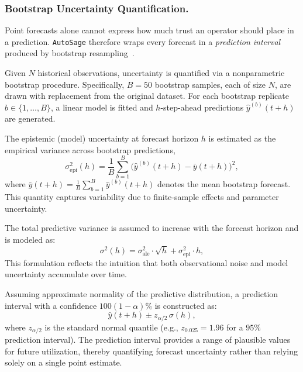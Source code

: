 \documentclass[sigconf]{acmart}
\newcommand{\Solution}{\texttt{AutoSage}}
\begin{document}
\subsubsection{Bootstrap Uncertainty Quantification.}
\label{subsec:uncert}

Point forecasts alone cannot express how much trust an operator should place in a prediction.  \Solution{} therefore wraps every forecast in a \emph{prediction interval} produced by bootstrap resampling~\cite{efron1993introduction}.

Given $N$ historical observations, uncertainty is quantified via a nonparametric bootstrap procedure. Specifically, $B = 50$ bootstrap samples, each of size $N$, are drawn with replacement from the original dataset. For each bootstrap replicate $b \in \{1,\dots,B\}$, a linear model is fitted and $h$-step-ahead predictions $\hat{y}^{(b)}(t+h)$ are generated.

The epistemic (model) uncertainty at forecast horizon $h$ is estimated as the empirical variance across bootstrap predictions,
\begin{equation}\label{eq:epistemic} \sigma^2_{\mathrm{epi}}(h) = \frac{1}{B}\sum_{b=1}^{B} \bigl(\hat{y}^{(b)}(t+h) - \bar{y}(t+h)\bigr)^{2}, 
\end{equation}
where $\bar{y}(t+h) = \frac{1}{B}\sum_{b=1}^{B}\hat{y}^{(b)}(t+h)$ denotes the mean bootstrap forecast. This quantity captures variability due to finite-sample effects and parameter uncertainty.

The total predictive variance is assumed to increase with the forecast horizon and is modeled as:
\begin{equation}\label{eq:total_var}
  \sigma^2(h) = \sigma^2_{\mathrm{ale}} \cdot \sqrt{h}
              + \sigma^2_{\mathrm{epi}} \cdot h,
\end{equation}
This formulation reflects the intuition that both observational noise and model uncertainty accumulate over time.

Assuming approximate normality of the predictive distribution, a prediction interval with a confidence $100(1-\alpha)\%$ is constructed as:
\begin{equation}\label{eq:pred_interval}
  \hat{y}(t+h) \pm z_{\alpha/2}\,\sigma(h),
\end{equation}
where $z_{\alpha/2}$ is the standard normal quantile (e.g., $z_{0.025}=1.96$ for a $95\%$ prediction interval). The prediction interval provides a range of plausible values for future utilization, thereby quantifying forecast uncertainty rather than relying solely on a single point estimate.
\end{document}
